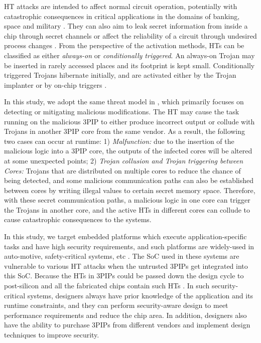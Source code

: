 \documentclass[10pt,journal, compsoc]{IEEEtran}
\begin{document}
HT attacks are intended to affect normal circuit operation, potentially with catastrophic consequences in critical applications in the domains of banking, space and military \cite{article:SB1}. They can also aim to leak secret information from inside a chip through secret channels or affect the reliability of a circuit through undesired process changes \cite{article:RC}. From the perspective of the activation methods, HTs can be classified as either \textit{always-on} or \textit{conditionally triggered}. An always-on Trojan may be inserted in rarely accessed places and its footprint is kept small. Conditionally triggered Trojans hibernate initially, and are activated either by the Trojan implanter or by on-chip triggers \cite{article:CL}.

In this study, we adopt the same threat model in \cite{article:CL, article:YS}, which primarily focuses on detecting or mitigating malicious modifications. The HT may cause the task running on the malicious 3PIP to either produce incorrect output or collude with Trojans in another 3PIP core from the same vendor. As a result, the following two cases can occur at runtime: 1) \textit{Malfunction:} due to the insertion of the malicious logic into a 3PIP core, the outputs of the infected cores will be altered at some unexpected points; 2) \textit{Trojan collusion and Trojan triggering between Cores:} Trojans that are distributed on multiple cores to reduce the chance of being detected, and some malicious communication paths can also be established between cores by writing illegal values to certain secret memory space. Therefore, with these secret communication paths, a malicious logic in one core can trigger the Trojans in another core, and the active HTs in different cores can collude to cause catastrophic consequences to the systems.%

In this study, we target embedded platforms which execute application-specific tasks and have high security requirements, and such platforms are widely-used in auto-motive, safety-critical systems, etc \cite{article:YS}. The SoC used in these systems are vulnerable to various HT attacks when the untrusted 3PIPs get integrated into this SoC. Because the HTs in 3PIPs could be passed down the design cycle to post-silicon and all the fabricated chips contain such HTs \cite{article:NP}. In such security-critical systems, designers always have prior knowledge of the application and its runtime constraints, and they can perform security-aware design to meet performance requirements and reduce the chip area. In addition, designers also have the ability to purchase 3PIPs from different vendors and implement design techniques to improve security.
\end{document}
